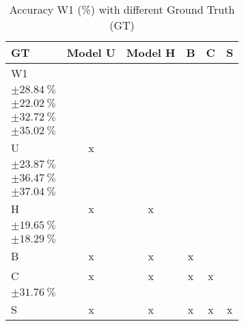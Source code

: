 \begin{table}[H]
\small
\centering
\caption{\label{tab:base3dRPEdatamask}%
  Accuracy W1 (\%) with different Ground Truth (GT)
}
\begin{tabular}{lccccc}
  \toprule
  GT & Model U                                                         & Model H                                                         & B & C                                                               & S \\
  \midrule
  W1 & \makecell{$\SI{75.31}{\percent}$ \\ $\pm \SI{28.84}{\percent}$} & \makecell{$\SI{25.05}{\percent}$ \\ $\pm \SI{22.02}{\percent}$} &   & \makecell{$\SI{50.78}{\percent}$ \\ $\pm \SI{32.72}{\percent}$} & \makecell{$\SI{38.16}{\percent}$ \\ $\pm \SI{35.02}{\percent}$} \\
  U & x                                                                & \makecell{$\SI{25.57}{\percent}$ \\ $\pm \SI{23.87}{\percent}$} &   & \makecell{$\SI{49.61}{\percent}$ \\ $\pm \SI{36.47}{\percent}$} & \makecell{$\SI{38.73}{\percent}$ \\ $\pm \SI{37.04}{\percent}$} \\
  H & x                                                                & x                                                               &   & \makecell{$\SI{41.98}{\percent}$ \\ $\pm \SI{19.65}{\percent}$} & \makecell{$\SI{82.51}{\percent}$ \\ $\pm \SI{18.29}{\percent}$} \\
  B & x                                                                & x                                                               & x &                                                                 &  \\
  C & x                                                                & x                                                               & x & x                                                               & \makecell{$\SI{54.47}{\percent}$ \\ $\pm \SI{31.76}{\percent}$} \\
  S & x                                                                & x                                                               & x & x                                                               & x \\
  \bottomrule
\end{tabular}
\end{table}

